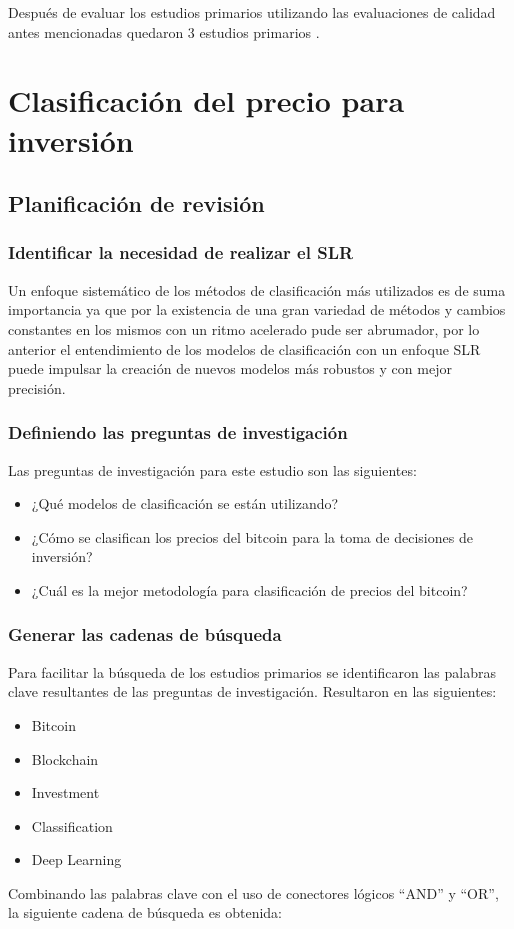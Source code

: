 Después de evaluar los estudios primarios utilizando las evaluaciones de calidad antes mencionadas quedaron 3 estudios primarios \parencite{chenMachineLearningModel2021,jiBestFeatureSelection2019,saadCharacterizingBlockchainbasedCryptocurrencies2018}.

\section{Clasificación del precio para inversión}

\subsection{Planificación de revisión}
\subsubsection{Identificar la necesidad de realizar el SLR}

Un enfoque sistemático de los métodos de clasificación más utilizados es de suma importancia ya que por la existencia de una gran variedad de métodos y cambios constantes en los mismos con un ritmo acelerado pude ser abrumador, por lo anterior el entendimiento de los modelos de clasificación con un enfoque SLR puede impulsar la creación de nuevos modelos más robustos y con mejor precisión.\\

\subsubsection{Definiendo las preguntas de investigación}
Las preguntas de investigación para este estudio son las siguientes:
\begin{itemize}
	\item ¿Qué modelos de clasificación se están utilizando?
	\item ¿Cómo se clasifican los precios del bitcoin para la toma de decisiones de inversión?
	\item ¿Cuál es la mejor metodología para clasificación de precios del bitcoin?
\end{itemize}

\subsubsection{Generar las cadenas de búsqueda}
Para facilitar la búsqueda de los estudios primarios se identificaron las palabras clave resultantes de las preguntas de investigación. Resultaron en las siguientes:
\begin{itemize}
	\item Bitcoin
	\item Blockchain
	\item Investment
	\item Classification
	\item Deep Learning
\end{itemize}
Combinando las palabras clave con el uso de conectores lógicos “AND” y “OR”, la siguiente cadena de búsqueda es obtenida:\\


